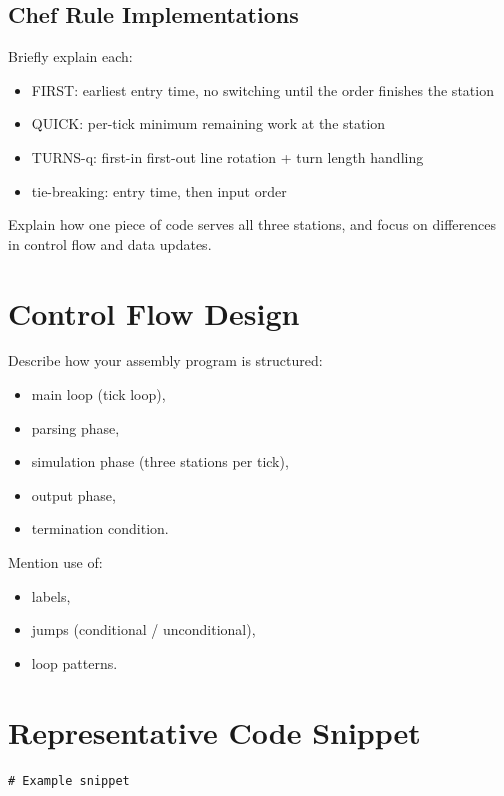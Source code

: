 \documentclass[a4paper,12pt]{article}
\begin{document}
\subsection{Chef Rule Implementations}

Briefly explain each:

\begin{itemize}
\item FIRST: earliest entry time, no switching until the order finishes the station
\item QUICK: per-tick minimum remaining work at the station
\item TURNS-q: first-in first-out line rotation + turn length handling
\item tie-breaking: entry time, then input order
\end{itemize}

Explain how one piece of code serves all three stations, and focus on differences in control flow and data updates.

\section{Control Flow Design}

Describe how your assembly program is structured:

\begin{itemize}
\item main loop (tick loop),
\item parsing phase,
\item simulation phase (three stations per tick),
\item output phase,
\item termination condition.
\end{itemize}

Mention use of:
\begin{itemize}
\item labels,
\item jumps (conditional / unconditional),
\item loop patterns.
\end{itemize}


\section{Representative Code Snippet}

\begin{lstlisting}[style=AsmStyle]
# Example snippet
\end{lstlisting}
\end{document}
